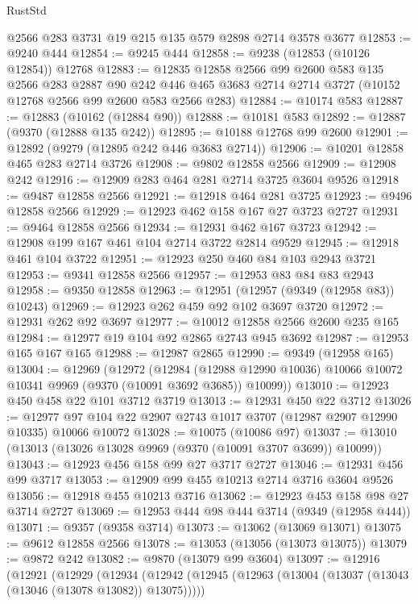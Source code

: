 \begin{lexlean}{RustStd}
\begin{coremodule}
    @2566
    @283
    @3731
    @19
    @215
    @135
    @579
    @2898
    @2714
    @3578
    @3677
@12853 := @9240 @444
@12854 := @9245 @444
@12858 := @9238 (@12853 (@10126 @12854)) @12768
@12883 := @12835
    @12858
    @2566
    @99
    @2600
    @583
    @135
    @2566
    @283
    @2887
    @90
    @242
    @446
    @465
    @3683
    @2714
    @2714
    @3727
    (@10152 @12768 @2566 @99 @2600 @583 @2566 @283)
@12884 := @10174 @583
@12887 := @12883 (@10162 (@12884 @90))
@12888 := @10181 @583
@12892 := @12887 (@9370 (@12888 @135 @242))
@12895 := @10188 @12768 @99 @2600
@12901 := @12892 (@9279 (@12895 @242 @446 @3683 @2714))
@12906 := @10201 @12858 @465 @283 @2714 @3726
@12908 := @9802 @12858 @2566
@12909 := @12908 @242
@12916 := @12909 @283 @464 @281 @2714 @3725 @3604 @9526
@12918 := @9487 @12858 @2566
@12921 := @12918 @464 @281 @3725
@12923 := @9496 @12858 @2566
@12929 := @12923 @462 @158 @167 @27 @3723 @2727
@12931 := @9464 @12858 @2566
@12934 := @12931 @462 @167 @3723
@12942 := @12908 @199 @167 @461 @104 @2714 @3722 @2814 @9529
@12945 := @12918 @461 @104 @3722
@12951 := @12923 @250 @460 @84 @103 @2943 @3721
@12953 := @9341 @12858 @2566
@12957 := @12953 @83 @84 @83 @2943
@12958 := @9350 @12858
@12963 := @12951 (@12957 (@9349 (@12958 @83)) @10243)
@12969 := @12923 @262 @459 @92 @102 @3697 @3720
@12972 := @12931 @262 @92 @3697
@12977 := @10012 @12858 @2566 @2600 @235 @165
@12984 := @12977 @19 @104 @92 @2865 @2743 @945 @3692
@12987 := @12953 @165 @167 @165
@12988 := @12987 @2865
@12990 := @9349 (@12958 @165)
@13004 := @12969
    (@12972
      (@12984
        (@12988 @12990 @10036)
        @10066
        @10072
        @10341
        @9969
        (@9370 (@10091 @3692 @3685))
        @10099))
@13010 := @12923 @450 @458 @22 @101 @3712 @3719
@13013 := @12931 @450 @22 @3712
@13026 := @12977 @97 @104 @22 @2907 @2743 @1017 @3707 (@12987 @2907 @12990 @10335) @10066 @10072
@13028 := @10075 (@10086 @97)
@13037 := @13010 (@13013 (@13026 @13028 @9969 (@9370 (@10091 @3707 @3699)) @10099))
@13043 := @12923 @456 @158 @99 @27 @3717 @2727
@13046 := @12931 @456 @99 @3717
@13053 := @12909 @99 @455 @10213 @2714 @3716 @3604 @9526
@13056 := @12918 @455 @10213 @3716
@13062 := @12923 @453 @158 @98 @27 @3714 @2727
@13069 := @12953 @444 @98 @444 @3714 (@9349 (@12958 @444))
@13071 := @9357 (@9358 @3714)
@13073 := @13062 (@13069 @13071)
@13075 := @9612 @12858 @2566
@13078 := @13053 (@13056 (@13073 @13075))
@13079 := @9872 @242
@13082 := @9870 (@13079 @99 @3604)
@13097 := @12916
    (@12921
      (@12929
        (@12934
          (@12942
            (@12945 (@12963 (@13004 (@13037 (@13043 (@13046 (@13078 @13082)) @13075)))))

\end{coremodule}
\end{lexlean}
